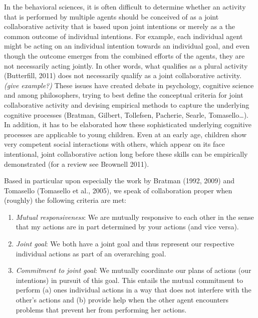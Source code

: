 \documentclass{article}
\begin{document}
In the behavioral sciences, it is often difficult to determine whether an
activity that is performed by multiple agents should be conceived of as a joint
collaborative activity that is based upon joint intentions or merely as a the
common outcome of individual intentions. For example, each individual agent
might be acting on an individual intention towards an individual goal, and even
though the outcome emerges from the combined efforts of the agents, they are
not necessarily acting jointly. In other words, what qualifies as a plural
activity (Butterfill, 2011) does not necessarily qualify as a joint
collaborative activity. \textit{(give example?)} These issues have created
debate in psychology, cognitive science and among philosophers, trying to best
define the conceptual criteria for joint collaborative activity and devising
empirical methods to capture the underlying cognitive processes (Bratman,
Gilbert, Tollefsen, Pacherie, Searle, Tomasello{\dots}). In addition, it has to
be elaborated how these sophisticated underlying cognitive processes are
applicable to young children. Even at an early age, children show very
competent social interactions with others, which appear on its face
intentional, joint collaborative action long before these skills can be
empirically demonstrated (for a review see Brownell 2011). 

Based in particular upon especially the work by Bratman (1992, 2009) and
Tomasello (Tomasello et al., 2005), we speak of collaboration proper when
(roughly) the following criteria are met:

\begin{enumerate}

\item \textit{Mutual responsiveness}: We are mutually responsive to each other
in the sense that my actions are in part determined by your actions (and vice
versa).

\item \textit{Joint goal}: We both have a joint goal and thus represent our
respective individual actions as part of an overarching goal.

\item \textit{Commitment to joint goal}: We mutually coordinate our plans of
actions (our intentions) in pursuit of this goal. This entails the mutual
commitment to perform (a) ones individual actions in a way that does not
interfere with the other{}'s actions and (b) provide help when the other agent
encounters problems that prevent her from performing her actions.

\end{enumerate}
\end{document}
